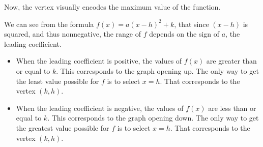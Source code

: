 \documentclass{ximera}
\begin{document}
\begin{image}
\end{image}



Now, the vertex visually encodes the maximum value of the function. 







We can see from the formula $f(x) = a (x - h)^2 + k$, that since $(x - h)$ is squared, and thus nonnegative, the range of $f$ depends on the sign of $a$, the leading coefficient. 


\begin{itemize}
     \item When the leading coefficient is positive, the values of $f(x)$ are greater than or equal to $k$. This corresponds to the graph opening up.  The only way to get the least value possible for $f$ is to select $x = h$. That corresponds to the vertex $(k, h)$. 


     \item When the leading coefficient is negative, the values of $f(x)$ are less than or equal to $k$. This corresponds to the graph opening down.  The only way to get the greatest value possible for $f$ is to select $x = h$. That corresponds to the vertex $(k, h)$.  
\end{itemize}
\end{document}
